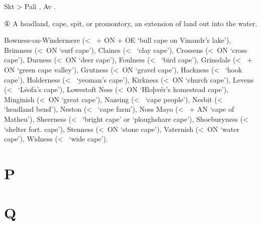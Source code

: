 \documentclass[12pt,letterpaper,oneside,article,draft]{memoir}
\begin{document}
\begin{Lemma}
\begin{Etymology}
		Skt   > Pali  , Av  .
\end{Etymology}
\begin{Definitions}
	① A headland, cape, spit, or promontory, an extension of land out into the water.
\end{Definitions}
\begin{Examples}
	Bowness-on-Windermere (<~ + ON  + OE  ‘bull cape on Vinandr’s lake’), Brimness (<~ON  ‘surf cape’), Claines (<~ ‘clay cape’), Crossens (<~ON  ‘cross cape’), Durness (<~ON  ‘deer cape’), Foulness (<~ ‘bird cape’), Grinsdale (<~ + ON  ‘green cape valley’), Grutness (<~ON  ‘gravel cape’), Hackness (<~ ‘hook cape’), Holderness (<~ ‘yeoman’s cape’), Kirkness (<~ON  ‘church cape’), Levens (<~ ‘Lēofa’s cape’), Lowestoft Ness (<~ON  ‘Hloþvér’s homestead cape’), Minginish (<~ON  ‘great cape’), Nazeing (<~ ‘cape people’), Nesbit (<~ ‘headland bend’), Neston (<~ ‘cape farm’), Noss Mayo (<~ + AN  ‘cape of Matheu’), Sheerness (<~ ‘bright cape’ or  ‘ploughshare cape’), Shoeburyness (<~ ‘shelter fort. cape’), Stenness (<~ON  ‘stone cape’), Vaternish (<~ON  ‘water cape’), Widness (<~ ‘wide cape’).
\end{Examples}
\end{Lemma}

\section*{P}

\begin{Lemma}
\end{Lemma}

\begin{Lemma}
\end{Lemma}

\section*{Q}
\end{document}

